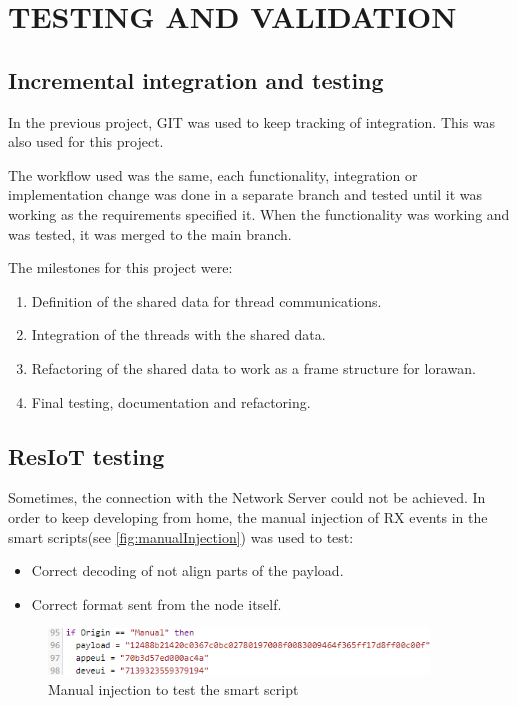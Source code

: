 \section{TESTING AND VALIDATION}
\subsection{Incremental integration and testing}

In the previous project, GIT was used to keep tracking of integration. This was also used for this project.

The workflow used was the same, each functionality, integration or implementation change was done in a separate branch and tested until it was working 
as the requirements specified it. When the functionality was working and was tested, it was merged to the main branch.

The milestones for this project were:
\begin{enumerate}
    \item Definition of the shared data for thread communications.
    \item Integration of the threads with the shared data.
    \item Refactoring of the shared data to work as a frame structure for \acrshort{lorawan}.
    \item Final testing, documentation and refactoring.
\end{enumerate}


\subsection{ResIoT testing}

Sometimes, the connection with the Network Server could not be achieved. In order to keep developing from home, the manual injection of RX events 
in the smart scripts(see \autoref{fig:manualInjection}) was used to test:
\begin{itemize}
    \item Correct decoding of not align parts of the payload.
    \item Correct format sent from the node itself.
\end{itemize}
\begin{figure}[H]
    \centering
    \includegraphics[width=0.9\textwidth]{images/8/manualInjection.png}
    \caption{Manual injection to test the smart script}
    \label{fig:manualInjection}
\end{figure}

